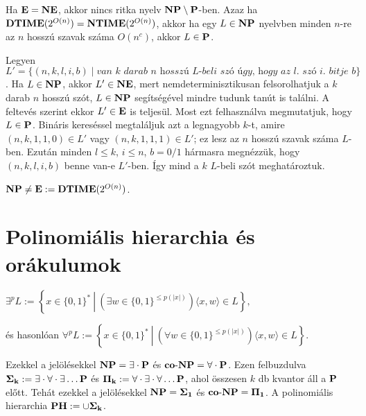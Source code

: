 \begin{Exercise}[counter={sorszam}, difficulty=0]
	Ha $\E=\NE$, akkor nincs ritka nyelv $\NP\setminus \P$-ben. Azaz ha $\DTIME(2^{O(n)})=\NTIME(2^{O(n)})$, akkor ha egy $L\in \NP$ nyelvben minden $n$-re az $n$ hossz\'u szavak sz\'ama $O(n^c)$, akkor $L\in \P$.
\end{Exercise}	
\begin{Answer}
	Legyen $L'=\{(n,k,l,i,b)\mid \textit{van k darab n hossz\'u L-beli sz\'o \'ugy, hogy az l.\ sz\'o i.\ bitje b}\}$.
	Ha $L\in \NP$, akkor $L'\in \NE$, mert nemdeterminisztikusan felsorolhatjuk a $k$ darab $n$ hossz\'u sz\'ot, $L\in \NP$ seg\'its\'eg\'evel mindre tudunk tan\'ut is tal\'alni.
	A feltev\'es szerint ekkor $L'\in \E$ is teljes\"ul.
	Most ezt felhaszn\'alva megmutatjuk, hogy $L\in \P$.
	Bin\'aris keres\'essel megtal\'aljuk azt a legnagyobb $k$-t, amire $(n,k,1,1,0)\in L'$ vagy $(n,k,1,1,1)\in L'$; ez lesz az $n$ hossz\'u szavak sz\'ama $L$-ben.
	Ezut\'an minden $l\le k$, $i\le n$, $b=0/1$ h\'armasra megn\'ezz\"uk, hogy $(n,k,l,i,b)$ benne van-e $L'$-ben.
	\'Igy mind a $k$ $L$-beli sz\'ot meghat\'aroztuk.
\end{Answer}


\begin{Exercise}[counter={sorszam}, difficulty=0]
	$\NP\neq \E:= \DTIME(2^{O(n)})$.
\end{Exercise}	







\chapter{Polinomi\'alis hierarchia \'es or\'akulumok}

 $\exists^p L := \left\{ x \in \{0,1\}^* \ \left| \ \left( \exists w \in \{0,1\}^{\leq p(|x|)} \right) \langle x,w \rangle \in L \right. \right\},$

\noindent
\'es hasonl\'oan $\forall^p L := \left\{ x \in \{0,1\}^* \ \left| \ \left( \forall w \in \{0,1\}^{\leq p(|x|)} \right) \langle x,w \rangle \in L \right. \right\}.$

\noindent
Ezekkel a jelölésekkel $\NP=\cl{\exists\cdot \P}$ és $\coNP=\cl{\forall\cdot \P}$. Ezen felbuzdulva $\Sigmak:=\cl{\exists\cdot\forall\cdot\exists\ldots \P}$ és $\Pik:=\cl{\forall\cdot\exists\cdot\forall\ldots \P}$, ahol összesen $k$ db kvantor áll a $\P$ el\H ott. Teh\'at ezekkel a jelölésekkel $\NP=\Sigmaone$ és $\coNP=\Pione$.
A polinomi\'alis hierarchia $\PH:=\cup \Sigmak$.

